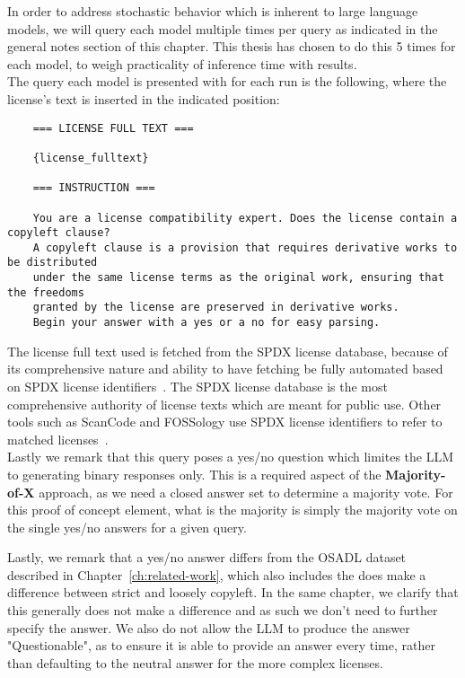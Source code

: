 In order to address stochastic behavior which is inherent to large language models, we will query each model multiple times per query as indicated in the general notes section of this chapter.   This thesis has chosen to do this 5 times for each model, to weigh practicality of inference time with results.\\

The query each model is presented with for each run is the following, where the license's text is inserted in the indicated position:

\begin{verbatim}
	=== LICENSE FULL TEXT ===
	
	{license_fulltext}
	
	=== INSTRUCTION ===
	
	You are a license compatibility expert. Does the license contain a copyleft clause?
	A copyleft clause is a provision that requires derivative works to be distributed
	under the same license terms as the original work, ensuring that the freedoms
	granted by the license are preserved in derivative works.
	Begin your answer with a yes or a no for easy parsing.
\end{verbatim}

The license full text used is fetched from the SPDX license database, because of its comprehensive nature and ability to have fetching be fully automated based on SPDX license identifiers~\cite{spdx-licenses}. The SPDX license database is the most comprehensive authority of license texts which are meant for public use. Other tools such as ScanCode and FOSSology use SPDX license identifiers to refer to matched licenses~\cite{scancode-home}\cite{fossology-home}. \\

Lastly we remark that this query poses a yes/no question which limites the LLM to generating binary responses only. This is a required aspect of the \textbf{Majority-of-X} approach, as we need a closed answer set to determine a majority vote. For this proof of concept element, what is the majority is simply the majority vote on the single yes/no answers for a given query.

Lastly, we remark that a yes/no answer differs from the OSADL dataset described in Chapter~\ref{ch:related-work}, which also includes the does make a difference between strict and loosely copyleft. In the same chapter, we clarify that this generally does not make a difference and as such we don't need to further specify the answer. We also do not allow the LLM to produce the answer "Questionable", as to ensure it is able to provide an answer every time, rather than defaulting to the neutral answer for the more complex licenses.

